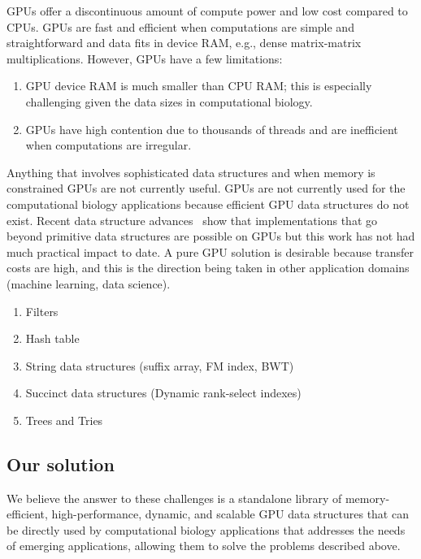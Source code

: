 GPUs offer a discontinuous amount of compute power and low cost compared to
CPUs. GPUs are fast and efficient when computations are simple and
straightforward and data fits in device RAM, e.g., dense matrix-matrix
multiplications.
However, GPUs have a few limitations:
\begin{enumerate}[noitemsep, leftmargin=*]
  \item GPU device RAM is much smaller than CPU RAM; this is especially
    challenging given the data sizes in computational biology.
  \item GPUs have high contention due to thousands of threads and are
    inefficient when computations are irregular.
\end{enumerate}

Anything that involves sophisticated data structures and when memory is
constrained GPUs are not currently useful.  GPUs are not currently used for the
computational biology applications because efficient GPU data structures do not
exist. Recent data structure advances~\cite{cite-something} show that
implementations that go beyond primitive data structures are possible on GPUs
but this work has not had much practical impact to date. A pure GPU solution is
desirable because transfer costs are high, and this is the direction being taken
in other application domains (machine learning, data science).



\begin{enumerate}[noitemsep, leftmargin=*]
  \item Filters
  \item Hash table
  \item String data structures (suffix array, FM index, BWT)
  \item Succinct data structures (Dynamic rank-select indexes)
  \item Trees and Tries
\end{enumerate}

\subsection{Our solution}

We believe the answer to these challenges is a standalone library of
memory-efficient, high-performance, dynamic, and scalable GPU data structures
that can be directly used by computational biology applications that addresses
the needs of emerging applications, allowing them to solve the problems
described above.

